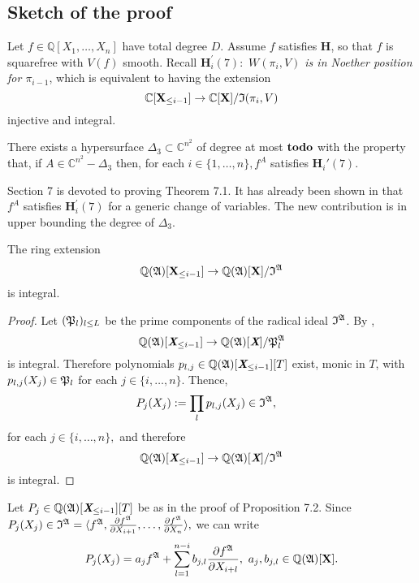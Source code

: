 \documentclass[sigconf]{acmart}
\def\td{{\bf todo}}
\def\Xb{\textit{\textbf{X}}}
\def\C{\mathbb{C}}
\def\I{\frak{I}}
\def\A{\frak{A}}
\def\fp{\frak{P}}
\begin{document}
\subsection{Sketch of the proof}
%
Let $f \in \mathbb{Q}[X_1,\hdots,X_n]$ have total degree $D$. Assume $f$ satisfies \textbf{H}, so that $f$ is squarefree with $V(f)$ smooth. Recall $\textbf{H}_i^{'}(7):$ \textit{$W(\pi_i,V)$ is in Noether position for $\pi_{i-1}$}, which is equivalent to having the extension  
\[
\C[\textbf{X}_{\leq i-1}]\rightarrow\C[\textbf{X}]/\frak{I}(\pi_i,V)
\]
injective and  integral.
%
\begin{theorem}
There exists a hypersurface $\Delta_3 \subset \C^{n^2}$ of degree at most $\td$ with the property that, if $A \in \C^{n^2} - \Delta_3$ then, for each $i \in\{1,\hdots,n\}, f^A$ satisfies $\textbf{H}_i'(7)$.
\end{theorem}
%
Section 7 is devoted to proving Theorem 7.1. It has already been shown in \cite{EMP} that $f^A$ satisfies $\textbf{H}_i^{'}(7)$ for a generic change of variables. The new contribution is in upper bounding the degree of $\Delta_3.$
%
\begin{proposition} 
The ring extension \[\mathbb{Q}(\frak{A})[\textbf{X}_{\leq i-1}]\rightarrow\mathbb{Q}(\frak{A})[\textbf{X}]/\I^{\A}\] is integral.
\end{proposition}
%
\begin{proof}
Let $(\frak{P}_l)_{l \leq L}$ be the prime components of the radical ideal $\I^\A$. By \cite[Proposition 1]{EMP}, 
\[
\mathbb{Q}(\frak{A})[\textit{\textbf{X}}_{\leq i-1}]\rightarrow\mathbb{Q}(\frak{A})[\textit{\textbf{X}}]/\fp_l^{\A}
\] 
is integral. Therefore polynomials $p_{l,j}\in\mathbb{Q}(\frak{A})[\Xb_{\leq i-1}][T]$ exist, monic in $T$, with $p_{l,j}(X_j)\in \frak{P}_l$ for each $j\in \{i,\hdots,n\}.$ Thence, 
%
\begin{align*}
&P_{j}(X_j) := \prod_l p_{l,j}(X_j)\in\I^\A, 
\end{align*}
%
for each $j \in \{i,\hdots,n\},$ and therefore 
\[
\mathbb{Q}(\frak{A})[\textit{\textbf{X}}_{\leq i-1}]\rightarrow\mathbb{Q}(\frak{A})[\textit{\textbf{X}}]/\I^{\A}
\] 
is integral.
\end{proof}
%
Let $P_{j} \in \mathbb{Q}(\frak{A})[\Xb_{\leq i-1}][T]$ be as in the proof of Proposition 7.2. Since $P_{j}(X_j) \in\I^{\A}= \langle f^\A,\frac{\partial f^\A}{\partial X_{i+1}},\hdots,\frac{\partial f^\A}{\partial X_n} \rangle,$
 we can write
\[
P_{j}(X_j) = a_j f^{\A} + \sum_{l=1}^{n-i}b_{j,l} \frac{\partial f^\A}{\partial X_{i+l}}, ~a_j,b_{j,l} \in \mathbb{Q}(\A)[\textbf{X}].
\]
\end{document}
